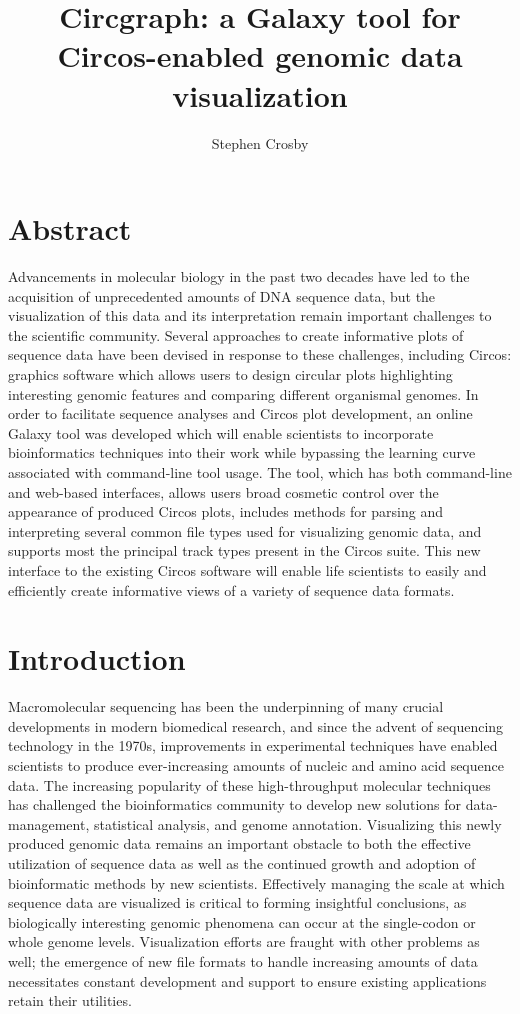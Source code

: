 \documentclass[twocolumn]{article}
\title{Circgraph: a Galaxy tool for Circos-enabled genomic data visualization}
\author{Stephen Crosby}
\begin{document}
\maketitle
\section*{Abstract}
Advancements in molecular biology in the past two decades have led to the acquisition of
unprecedented amounts of DNA sequence data, but the visualization of this data and its
interpretation remain important challenges to the scientific community. Several approaches to
create informative plots of sequence data have been devised in response to these challenges, 
including Circos: \cite{circospaper} graphics software which allows users to design circular plots highlighting
interesting genomic features and comparing different organismal genomes. In order to facilitate sequence analyses and Circos plot development, an online Galaxy \cite{galaxypaper} tool was developed which
will enable scientists to incorporate bioinformatics techniques into their work while bypassing the learning curve associated with command-line tool usage. The tool, which has both command-line and web-based interfaces, allows users broad cosmetic control over the appearance of produced Circos plots, includes methods for parsing and interpreting several common file types used for visualizing genomic data, and supports most the principal track types present in the Circos suite. This new interface to the existing Circos software will enable life scientists to easily and efficiently create informative views of a variety of sequence data formats.

\section*{Introduction}
Macromolecular sequencing has been the underpinning of many crucial developments in modern biomedical research, and since the advent of sequencing technology in the 1970s, improvements in experimental techniques have enabled scientists to produce ever-increasing amounts of nucleic and amino acid sequence data. The increasing popularity of these high-throughput molecular techniques has challenged the bioinformatics community to develop new solutions for data-management, statistical analysis, and genome annotation.\cite{challenge} Visualizing this newly produced genomic data remains an important obstacle to both the effective utilization of sequence data as well as the continued growth and adoption of bioinformatic methods by new scientists.\cite{challenge} Effectively managing the scale at which sequence data are visualized is critical to forming insightful conclusions, as biologically interesting genomic phenomena can occur at the single-codon or whole genome levels.\cite{challenge} Visualization efforts are fraught with other problems as well; the emergence of new file formats to handle increasing amounts of data necessitates constant development and support to ensure existing applications retain their utilities.\cite{challenge}
\end{document}
